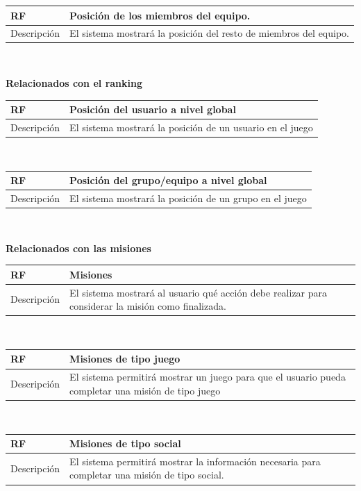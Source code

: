 \documentclass[twoside]{report}
\newcommand\addrow[2]{#1 &#2\\ }
\newcommand\addheading[2]{#1 &#2\\ \hline}
\newcommand\tabularhead{\begin{tabular}{lp{0.7\textwidth}}
\hline
}
\newenvironment{req}{\tabularhead}
{\hline\end{tabular}}
\begin{document}
\begin{req}
	\addheading{\textbf{RF\arabic{functionalRequirements}}}{Posición de los miembros del equipo.}
	\addrow{Descripción}{El sistema mostrará la posición del resto de miembros del equipo. }
\end{req}\\

\textbf{Relacionados con el ranking}\\

\begin{req}
	\addheading{\textbf{RF\arabic{functionalRequirements}}}{Posición del usuario a nivel global}
	\addrow{Descripción}{El sistema mostrará la posición de un usuario en el juego}
\end{req}\\

\begin{req}
	\addheading{\textbf{RF\arabic{functionalRequirements}}}{Posición del grupo/equipo a nivel global}
	\addrow{Descripción}{El sistema mostrará la posición de un grupo en el juego}
\end{req}\\

\textbf{Relacionados con las misiones}\\

\begin{req}
	\addheading{\textbf{RF\arabic{functionalRequirements}}}{Misiones}
	\addrow{Descripción}{El sistema mostrará al usuario qué acción debe realizar para considerar la misión como finalizada.}
\end{req}\\

\begin{req}
	\addheading{\textbf{RF\arabic{functionalRequirements}}}{Misiones de tipo juego}
	\addrow{Descripción}{El sistema permitirá mostrar un juego para que el usuario pueda completar una misión de tipo juego}
\end{req}\\

\begin{req}
	\addheading{\textbf{RF\arabic{functionalRequirements}}}{Misiones de tipo social}
	\addrow{Descripción}{El sistema permitirá mostrar la información necesaria para completar una misión de tipo social.}
\end{req}\\
\end{document}
